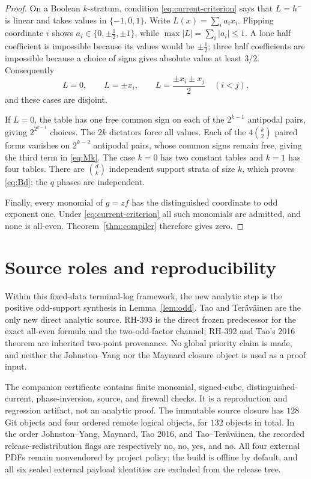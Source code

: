 \documentclass[11pt]{article}
\theoremstyle{definition}
\theoremstyle{remark}
\begin{document}
\begin{proof}
On a Boolean \(k\)-stratum, condition \eqref{eq:current-criterion} says
that \(L=h^-\) is linear and takes values in \(\{-1,0,1\}\).  Write
\(L(x)=\sum_i a_ix_i\).  Flipping coordinate \(i\) shows
\(a_i\in\{0,\pm\tfrac12,\pm1\}\), while
\(\max|L|=\sum_i|a_i|\leq1\).  A lone half coefficient is impossible
because its values would be \(\pm\tfrac12\); three half coefficients are
impossible because a choice of signs gives absolute value at least
\(3/2\).  Consequently
\begin{equation}
 L=0,\qquad L=\pm x_i,\qquad
 L=\frac{\pm x_i\pm x_j}{2}\quad(i<j),
 \label{eq:L-classification}
\end{equation}
and these cases are disjoint.

If \(L=0\), the table has one free common sign on each of the
\(2^{k-1}\) antipodal pairs, giving \(2^{2^{k-1}}\) choices.  The
\(2k\) dictators force all values.  Each of the \(4\binom{k}{2}\) paired
forms vanishes on \(2^{k-2}\) antipodal pairs, whose common signs remain
free, giving the third term in \eqref{eq:Mk}.  The case \(k=0\) has two
constant tables and \(k=1\) has four tables.  There are \(\binom{d}{k}\)
independent support strata of size \(k\), which proves \eqref{eq:Bd}; the
\(q\) phases are independent.

Finally, every monomial of \(g=z f\) has the distinguished coordinate to
odd exponent one.  Under \eqref{eq:current-criterion} all such monomials
are admitted, and none is all-even.  Theorem~\ref{thm:compiler} therefore
gives zero.
\end{proof}

\section{Source roles and reproducibility}

Within this fixed-data terminal-log framework, the new analytic step is
the positive odd-support synthesis in Lemma~\ref{lem:odd}.  Tao and
Ter\"av\"ainen are the only new direct analytic source.  RH-393 is the
direct frozen predecessor for the exact all-even formula and the
two-odd-factor channel; RH-392 and Tao's 2016 theorem are inherited
two-point provenance.  No global priority claim is made, and neither the
Johnston--Yang nor the Maynard closure object is used as a proof input.

The companion certificate contains finite monomial, signed-cube,
distinguished-current, phase-inversion, source, and firewall checks.  It is
a reproduction and regression artifact, not an analytic proof.  The
immutable source closure has \(128\) Git objects and four ordered remote
logical objects, for \(132\) objects in total.  In the order
Johnston--Yang, Maynard, Tao 2016, and Tao--Ter\"av\"ainen, the recorded
release-redistribution flags are respectively
no, no, yes, and no.  All four external PDFs remain nonvendored by project
policy; the build is offline by default, and all six sealed external
payload identities are excluded from the release tree.
\end{document}
